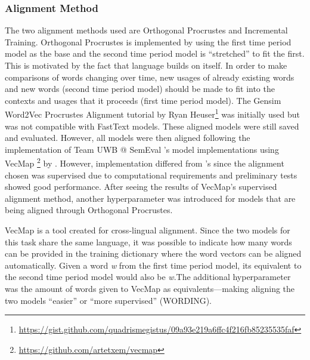 \subsubsection{Alignment Method}

The two alignment methods used are Orthogonal Procrustes and Incremental Training. Orthogonal Procrustes is implemented by using the first time period model as the base and the second time period model is “stretched” to fit the first. This is motivated by the fact that language builds on itself. In order to make comparisons of words changing over time, new usages of already existing words and new words (second time period model) should be made to fit into the contexts and usages that it proceeds (first time period model). The Gensim Word2Vec Procrustes Alignment tutorial by Ryan Heuser\footnote{\url{https://gist.github.com/quadrismegistus/09a93e219a6ffc4f216fb85235535faf}}  was initially used but was not compatible with FastText models. These aligned models were still saved and evaluated. However, all models were then aligned following the implementation of Team UWB @ SemEval \citet{prazak-etal-2020-uwb}’s model implementations using VecMap \footnote{\url{https://github.com/artetxem/vecmap}} by \citet{artetxe2018generalizing}. However, implementation differed from \citet{prazak-etal-2020-uwb}’s since the alignment chosen was supervised due to computational requirements and preliminary tests showed good performance. After seeing the results of VecMap’s supervised alignment method, another hyperparameter was introduced for models that are being aligned through Orthogonal Procrustes.

VecMap is a tool created for cross-lingual alignment. Since the two models for this task share the same language, it was possible to indicate how many words can be provided in the training dictionary where the word vectors can be aligned automatically. Given a word \emph{w} from the first time period model, its equivalent to the second time period model would also be \emph{w}.The additional hyperparameter was the amount of words given to VecMap as equivalents—making aligning the two models “easier” or “more supervised” (WORDING).


